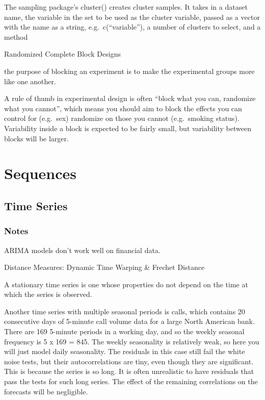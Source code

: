 \documentclass[]{book}
\begin{document}
The sampling package's cluster() creates cluster samples. It takes in a dataset name, the variable in the set to be used as the cluster variable, passed as a vector with the name as a string, e.g.~c(``variable''), a number of clusters to select, and a method

Randomized Complete Block Designs

the purpose of blocking an experiment is to make the experimental groups more like one another.

A rule of thumb in experimental design is often ``block what you can, randomize what you cannot'', which means you should aim to block the effects you can control for (e.g.~sex) randomize on those you cannot (e.g.~smoking status). Variability inside a block is expected to be fairly small, but variability between blocks will be larger.

\hypertarget{sequences-1}{%
\chapter{Sequences}\label{sequences-1}}

\hypertarget{time-series}{%
\section{Time Series}\label{time-series}}

\hypertarget{notes}{%
\subsection{Notes}\label{notes}}

ARIMA models don't work well on financial data.

Distance Measures: Dynamic Time Warping \& Frechet Distance

A stationary time series is one whose properties do not depend on the time at which the series is observed.

Another time series with multiple seasonal periods is calls, which contains 20 consecutive days of 5-minute call volume data for a large North American bank. There are 169 5-minute periods in a working day, and so the weekly seasonal frequency is 5 x 169 = 845. The weekly seasonality is relatively weak, so here you will just model daily seasonality. The residuals in this case still fail the white noise tests, but their autocorrelations are tiny, even though they are significant. This is because the series is so long. It is often unrealistic to have residuals that pass the tests for such long series. The effect of the remaining correlations on the forecasts will be negligible.
\end{document}
